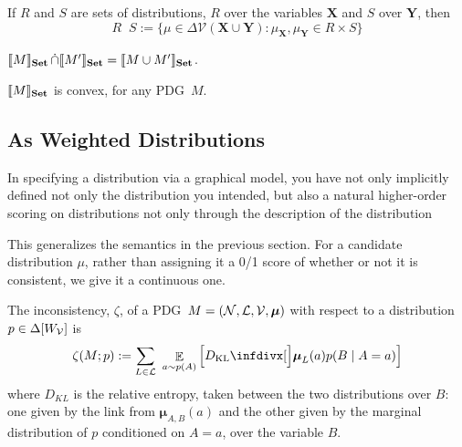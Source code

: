 \documentclass{article}
\newcommand\Set{\textbf{Set}}
\newcommand\bmu{\boldsymbol{\mu}}
\newcommand{\MN}{PDG}
\DeclareMathOperator\dcap{\mathop{\dot\cap}}
\begin{document}
	
	If $R$ and $S$ are sets of distributions, $R$ over the variables $\mathbf X$ and $S$ over $\mathbf Y$, then
	$$R \dcap S := \{ \mu \in  \Delta \mathcal V(\mathbf X \cup \mathbf Y) : \mu_{\mathbf X}, \mu_{\mathbf Y} \in R \times S \}  $$
	\begin{prop}
		$\bbr{M}_\Set \dcap \bbr{M'}_\Set = \bbr{M \cup M'}_\Set$.
	\end{prop}

	
	
	\begin{lemma}[restate=thmsetconvex] 
		\label{prop:convex}
		$\bbr{M}_\Set$ is convex, for any \MN\ $M$.
	\end{lemma}%






	\subsection{As Weighted Distributions}
	
	
	
	In specifying a distribution via a graphical model, you have not only implicitly defined not only the distribution you intended, but also a natural higher-order scoring on distributions not only through the description of the distribution 
	
 	This generalizes the semantics in the previous section. For a candidate distribution $\mu$, rather than assigning it a 0/1 score of whether or not it is consistent, we give it a continuous one.

	\begin{defn}
		The inconsistency, $\zeta$, of a \MN\ $M = (\cal N, L, V, \bmu)$ with respect to a distribution $p \in \Delta[W_{\cal V}]$ is
		\[
			\zeta(M ; p) := %
			\sum_{L \in \cal L}~\mathop{\mathbb E}_{a \sim p(A)} \left[\kldiv[\Big]{\bmu_{L}(a) }{ p(B \mid A = a) } \right]
		\]
		where $D_{KL}$ is the relative entropy, taken between the two distributions over $B$: one given by the link from $\bmu_{A,B}(a)$ and the other given by the marginal distribution of $p$ conditioned on $A = a$, over the variable $B$.
	\end{defn}	
	
\end{document}
